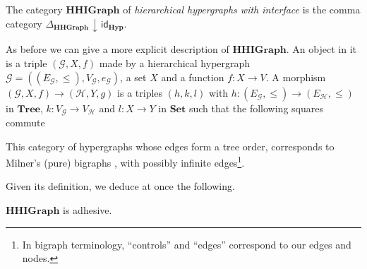 \documentclass[runningheads,envcountsect]{lmcs}
\newcommand{\hyp}{\catname{Hyp}}
\newcommand{\catname}[1]{\mathbf{#1}}
\newcommand{\id}[1]{\mathsf{id}_{#1}}
\newcommand{\comma}[2]{#1\hspace{1pt} {\downarrow}\hspace{1pt} #2}
\newcommand{\tree}{\catname{Tree}}
\theoremstyle{plain}
\theoremstyle{definition}
\begin{document}
\begin{defi}The category $\catname{HHIGraph}$ of \emph{hierarchical hypergraphs with interface} is the comma category $\comma{\Delta_{\catname{HHGraph}}}{\id{\hyp}}$.
\end{defi}
As before we can give a more explicit description of $\catname{HHIGraph}$. An object in it is a triple $(\mathcal{G}, X, f)$ made by a hierarchical hypergraph $\mathcal{G}=((E_\mathcal{G}, \leq), V_\mathcal{G}, e_\mathcal{G})$, a set $X$ and a function $f:X\to V$. A morphism $(\mathcal{G}, X, f)\to (\mathcal{H}, Y, g)$ is a triples $(h,k,l)$  with $h:(E_\mathcal{G}, \leq)\rightarrow (E_\mathcal{H}, \leq)$ in $\tree$, $k:V_\mathcal{G}\rightarrow V_\mathcal{H}$  and $l:X\rightarrow Y$ in $\catname{Set}$ such that the following squares commute
	\begin{center}
	\end{center}

\begin{rem}This category of hypergraphs whose edges form a tree order, corresponds to Milner's (pure) bigraphs \cite{milner:bigraphs}, with possibly infinite edges\footnote{In bigraph terminology, ``controls'' and ``edges'' correspond to our edges and nodes.}.
\end{rem} 
 
 Given its definition, we deduce at once the following.
\begin{thm}
	$\catname{HHIGraph}$ is adhesive.
\end{thm}

 
 
\end{document}
